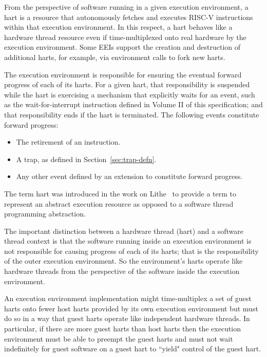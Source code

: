 From the perspective of software running in a given execution
environment, a hart is a resource that autonomously fetches and
executes RISC-V instructions within that execution environment.  In
this respect, a hart behaves like a hardware thread resource even if
time-multiplexed onto real hardware by the execution environment.
Some EEIs support the creation and destruction of additional harts,
for example, via environment calls to fork new harts.

The execution environment is responsible for ensuring the eventual forward
progress of each of its harts.
For a given hart, that responsibility is suspended while the hart is
exercising a mechanism that explicitly waits for an event, such as the
wait-for-interrupt instruction defined in Volume II of this specification; and
that responsibility ends if the hart is terminated.
The following events constitute forward progress:
\vspace{-0.2in}
\begin{itemize}
\parskip 0pt
\itemsep 1pt
\item The retirement of an instruction.
\item A trap, as defined in Section~\ref{sec:trap-defn}.
\item Any other event defined by an extension to constitute forward progress.
\end{itemize}

\begin{commentary}
The term hart was introduced in the work on
Lithe~\cite{lithe-pan-hotpar09,lithe-pan-pldi10} to provide a term to
represent an abstract execution resource as opposed to a software
thread programming abstraction.

The important distinction between a hardware thread (hart) and a
software thread context is that the software running inside an
execution environment is not responsible for causing progress of each
of its harts; that is the responsibility of the outer execution
environment.  So the environment's harts operate like hardware threads
from the perspective of the software inside the execution environment.

An execution environment implementation might time-multiplex a set of
guest harts onto fewer host harts provided by its own execution
environment but must do so in a way that guest harts operate like
independent hardware threads.  In particular, if there are more guest
harts than host harts then the execution environment must be able to
preempt the guest harts and must not wait indefinitely for guest
software on a guest hart to ``yield" control of the guest hart.
\end{commentary}

